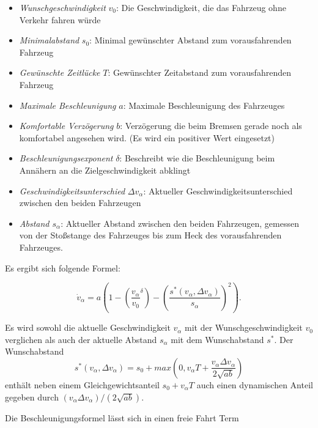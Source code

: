 \begin{itemize}
\item \textit{Wunschgeschwindigkeit} \( v_{0} \): Die Geschwindigkeit, die das Fahrzeug ohne Verkehr fahren w\"urde
\item \textit{Minimalabstand} \(s_{0}\): Minimal gew\"unschter Abstand zum vorausfahrenden Fahrzeug
\item \textit{Gew\"unschte Zeitl\"ucke} \( T \): Gew\"unschter Zeitabstand zum vorausfahrenden Fahrzeug
\item \textit{Maximale Beschleunigung} \( a \): Maximale Beschleunigung des Fahrzeuges
\item \textit{Komfortable Verz\"ogerung} \( b \): Verz\"ogerung die beim Bremsen gerade noch als komfortabel angesehen wird. (Es wird ein positiver Wert eingesetzt)
\item \textit{Beschleunigungsexponent} \( \delta \): Beschreibt wie die Beschleunigung beim Ann\"ahern an die Zielgeschwindigkeit abklingt
\item \textit{Geschwindigkeitsunterschied} \( \Delta v_\alpha \): Aktueller Geschwindigkeitsunterschied zwischen den beiden Fahrzeugen
\item \textit{Abstand \( s_\alpha \)}: Aktueller Abstand zwischen den beiden Fahrzeugen, gemessen von der Sto{\ss}stange des Fahrzeuges bis zum Heck des vorausfahrenden Fahrzeuges.
\end{itemize}

Es ergibt sich folgende Formel:

\begin{equation}
   \dot{v}_\alpha = a \left( 1 - \left( \frac{v_\alpha}{v_0}^\delta \right) - \left( \frac{s^*(v_\alpha, \Delta v_\alpha)}{s_\alpha}\right)^2\right).
\end{equation}

Es wird sowohl die aktuelle Geschwindigkeit \( v_\alpha\) mit der Wunschgeschwindigkeit \( v_{0} \) verglichen als auch der aktuelle Abstand \( s_\alpha \) mit dem Wunschabstand \( s^*\).
Der Wunschabstand
\begin{equation}
   s^*(v_\alpha, \Delta v_\alpha) =  s_0 + max \left( 0, v_\alpha T + \frac{v_\alpha \Delta v_\alpha}{2 \sqrt{ab}}\right)\end{equation}
enth\"alt neben einem Gleichgewichtsanteil \(s_0 + v_\alpha T \) auch einen dynamischen Anteil gegeben durch \( (v_\alpha \Delta v_\alpha)/(2 \sqrt{ab}) \).

Die Beschleunigungsformel l\"asst sich in einen freie Fahrt Term

